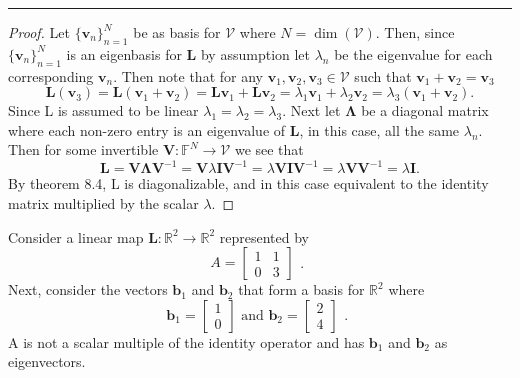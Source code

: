 \documentclass[12pt]{amsart}
\newcommand{\1}{\mathbbm{1}}
\newcommand{\la}{\lambda}
\numberwithin{equation}{section}
\numberwithin{Theorem}{section}
\theoremstyle{plain} %
\theoremstyle{definition}
\theoremstyle{remark}
\begin{document}
\begin{enumerate}[1.]
\bigskip
\hrule
\bigskip
\begin{proof}
	Let \(\{\mathbf{v}_n\}_{n=1}^N\) be as basis for $\mathcal{V}$ where \(N=\dim(\mathcal{V})\). 
	Then, since \(\{\mathbf{v}_n\}_{n=1}^N\) is an eigenbasis for 
	\(\mathbf{L}\) by assumption let
	\(\la_n\) be the eigenvalue for each corresponding \(\mathbf{v}_n\).
	Then note that for any \(\mathbf{v}_1,\mathbf{v}_2,\mathbf{v}_3 \in\mathcal{V}\) such that
	\(\mathbf{v}_1+\mathbf{v}_2=\mathbf{v}_3\)
	\[
	\mathbf{L}(\mathbf{v}_3)
	= \mathbf{L}(\mathbf{v}_1+\mathbf{v}_2)
	= \mathbf{L}\mathbf{v}_1+\mathbf{L}\mathbf{v}_2
	= \la_1\mathbf{v}_1+\la_2\mathbf{v}_2
	= \la_3(\mathbf{v}_1+\mathbf{v}_2)
	.\]
	Since L is assumed to be linear \(\la_1=\la_2=\la_3\).
	Next let \(\boldsymbol{\Lambda}\) be a diagonal matrix where each non-zero entry is an eigenvalue of $\mathbf{L}$, in this case, all the same \(\la_n\).
	Then for some invertible $\mathbf{V}:\mathbb{F}^N\to\mathcal{V}$ we see that
	\[
	\mathbf{L}
	=\mathbf{V}\boldsymbol{\Lambda}\mathbf{V}^{-1}
	=\mathbf{V}\la\mathbf{I}\mathbf{V}^{-1}
	=\la\mathbf{V}\mathbf{I}\mathbf{V}^{-1}
	=\la\mathbf{V}\mathbf{V}^{-1}
	=\la\mathbf{I}.
	\]
	By theorem 8.4, L is diagonalizable, 
	and in this case equivalent to the identity matrix multiplied by the scalar \(\la\).		
\end{proof}

\vspace{2em}

Consider a linear map \(\mathbf{L}:\mathbb{R}^{2}\to\mathbb{R}^{2}\) 
represented by
\[ A = \begin{bmatrix} 1 & 1 \\	0 & 3 \end{bmatrix}
\begin{matrix}  \\ . \end{matrix}\]
Next, consider the vectors $\mathbf{b}_1$ and $\mathbf{b}_2$ 
that form a basis for \(\mathbb{R}^2\) where
\[ \mathbf{b}_1 = \begin{bmatrix} 1 \\ 0 \end{bmatrix}
\text{ and }
\mathbf{b}_2 = \begin{bmatrix} 2 \\ 4 \end{bmatrix}
\begin{matrix}  \\ . \end{matrix}\]
A is not a scalar multiple of the identity operator
and has \(\mathbf{b}_1\) and \(\mathbf{b}_2\) as eigenvectors.


\end{enumerate}
\end{document}
